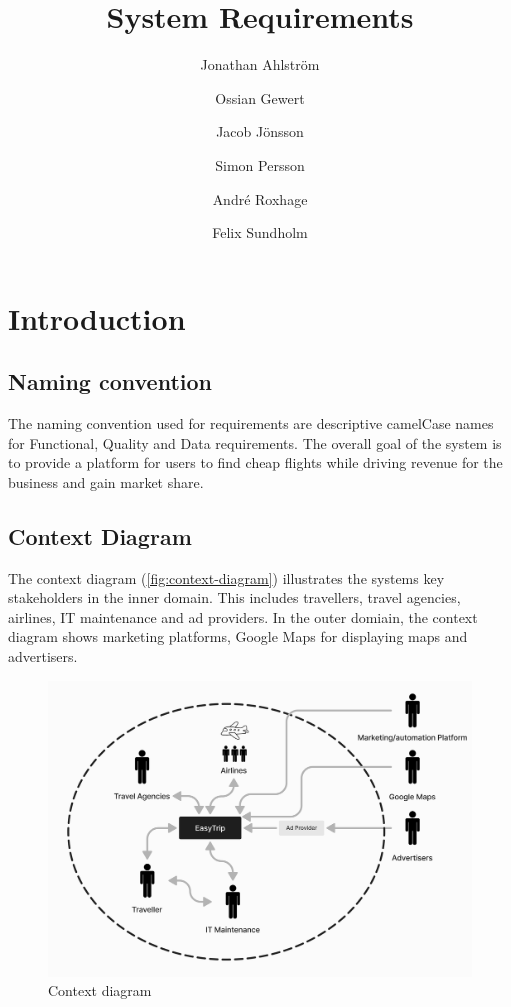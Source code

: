 \documentclass[a4paper]{article}
\title{System Requirements}
\author{Jonathan Ahlström \and Ossian Gewert \and Jacob Jönsson \and Simon Persson \and André Roxhage \and Felix Sundholm}
\begin{document}
\maketitle

\begin{center}
    
\end{center}

\newpage
\tableofcontents
\newpage

\section{Introduction}
\subsection{Naming convention}
The naming convention used for requirements are descriptive camelCase names for Functional, Quality and Data requirements.
The overall goal of the system is to provide a platform for users to find cheap flights while driving revenue for the business and gain market share.

\subsection{Context Diagram}
The context diagram (\autoref{fig:context-diagram}) illustrates the systems key stakeholders in the inner domain. This includes travellers, travel agencies, airlines, IT maintenance and ad providers. In the outer domiain, the context diagram shows marketing platforms, Google Maps for displaying maps and advertisers.
\begin{figure}[H]
    \includegraphics[width=.99\textwidth]{resources/contextDiagram.png}
    \caption{Context diagram}
    \label{fig:context-diagram}
\end{figure}
\end{document}
